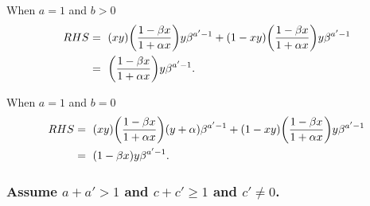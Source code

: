 \documentclass[ALCO, Unicode]{cedram}
\DeclarePairedDelimiter\autobracket{(}{)}
\newcommand{\br}[1]{\autobracket*{#1}}
\begin{document}
When $a=1$ and $b>0$
\begin{align*}
RHS=\text{ }& \br{x y}\br{\dfrac{1-\beta x}{1+\alpha x}}y \beta^{a'-1}+\br{1-xy}\br{\dfrac{1-\beta x}{1+\alpha x}}y\beta^{a'-1}\\
=\text{ }& \br{\dfrac{1-\beta x}{1+\alpha x}}y\beta^{a'-1}.
\end{align*}

When $a=1$ and $b=0$
\begin{align*}
RHS=\text{ }& \br{x y}\br{\dfrac{1-\beta x}{1+\alpha x}}(y+\alpha) \beta^{a'-1}+\br{1-xy}\br{\dfrac{1-\beta x}{1+\alpha x}}y\beta^{a'-1}\\
=\text{ }& \br{1-\beta x}y\beta^{a'-1}.
\end{align*}



\subsubsection{Assume $a+a'>1$ and $c+c'\geq 1$ and $c'\neq 0$.}
\end{document}
